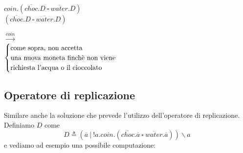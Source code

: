		\begin{minipage}{0.5\linewidth}
			\begin{flushleft}
				$coin.(\overline{choc}.D\ \square \ \overline{water}.D)$\\
				\vspace{18mm}
				$(\overline{choc}.D\ \square \ \overline{water}.D)$\\
			\end{flushleft}
		\end{minipage}
		\hfill
		\begin{minipage}{0.4\linewidth}
			\begin{flushright}
				\vspace{10mm}
				$\xrightarrow{coin}$\\
				\vspace{10mm}
				$\begin{cases}
				\text{come sopra, non accetta}\\
				\text{una nuova moneta finch\`e\ non viene}\\
				\text{richiesta l'acqua o il cioccolato}\\
				\end{cases}$
			\end{flushright}
		\end{minipage}
		
		\subsection{Operatore di replicazione}
		
		\qquad Similare \eacc anche la soluzione che prevede l'utilizzo dell'operatore di replicazione. Definiamo $D$ come
		$$D \triangleq (\overline{a}\ |\ !a.coin.(\overline{choc}.\overline{a}\ \square\ \overline{water}.\overline{a}))\backslash a$$ e vediamo ad esempio una possibile computazione:
		

